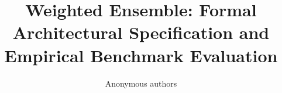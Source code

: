 \title{\textbf{Weighted Ensemble: Formal Architectural Specification and Empirical Benchmark Evaluation}}

\author{Anonymous authors}
